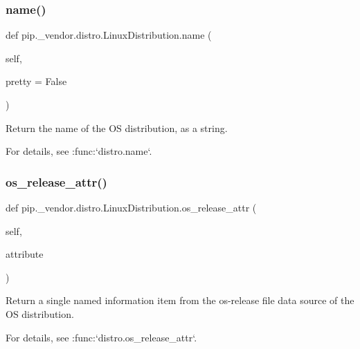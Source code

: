 \subsubsection{\texorpdfstring{name()}{name()}}
{\footnotesize\ttfamily def pip.\+\_\+vendor.\+distro.\+Linux\+Distribution.\+name (\begin{DoxyParamCaption}\item[{}]{self,  }\item[{}]{pretty = {\ttfamily False} }\end{DoxyParamCaption})}

\begin{DoxyVerb}Return the name of the OS distribution, as a string.

For details, see :func:`distro.name`.
\end{DoxyVerb}
 \mbox{\label{classpip_1_1__vendor_1_1distro_1_1LinuxDistribution_a2c980e7f2faf33563d32e0a0b1309cfa}} 
\subsubsection{\texorpdfstring{os\+\_\+release\+\_\+attr()}{os\_release\_attr()}}
{\footnotesize\ttfamily def pip.\+\_\+vendor.\+distro.\+Linux\+Distribution.\+os\+\_\+release\+\_\+attr (\begin{DoxyParamCaption}\item[{}]{self,  }\item[{}]{attribute }\end{DoxyParamCaption})}

\begin{DoxyVerb}Return a single named information item from the os-release file data
source of the OS distribution.

For details, see :func:`distro.os_release_attr`.
\end{DoxyVerb}
 \mbox{\label{classpip_1_1__vendor_1_1distro_1_1LinuxDistribution_ae22f1ae28f0b6f8a20b0ffd3ddea6af6}} 
